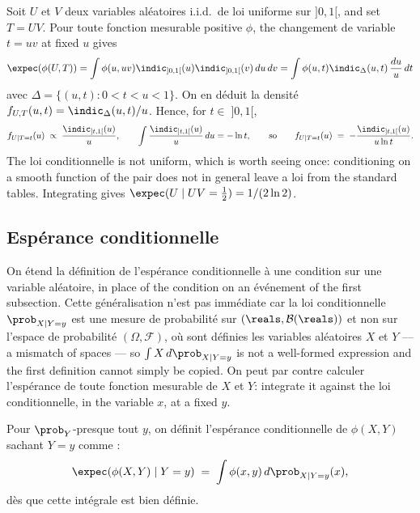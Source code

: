 \begin{example}
  Soit $U$ et $V$ deux variables aléatoires i.i.d.\ de loi uniforme sur $]0,1[$, and
  set $T = UV$. Pour toute fonction mesurable positive $\phi$, the changement de
  variable $t = uv$ at fixed $u$ gives
  \[
    \expec(\phi(U,T)) = \int \phi(u,uv) \indic_{]0,1[}(u) \indic_{]0,1[}(v) \, du \, dv
    = \int \phi(u,t) \indic_{\Delta}(u,t) \, \frac{du}{u} \, dt
  \]
  avec $\Delta = \{(u,t) : 0 < t < u < 1\}$. On en déduit la densité
  $f_{U,T}(u,t) = \indic_{\Delta}(u,t)/u$.
  Hence, for $t \in \;]0,1[$,
  \[
    f_{U \mid T = t}(u) \;\propto\; \frac{\indic_{]t,1[}(u)}{u} ,
    \qquad \int \frac{\indic_{]t,1[}(u)}{u} \, du = -\ln t ,
    \qquad\text{so}\qquad
    f_{U \mid T = t}(u) \;=\; -\frac{\indic_{]t,1[}(u)}{u \ln t} .
  \]
  The loi conditionnelle is not uniform, which is worth seeing once: conditioning on
  a smooth function of the pair does not in general leave a loi from the
  standard tables. Integrating gives
  $\expec(U \mid UV = \tfrac{1}{2}) = 1/(2\ln 2)$.
\end{example}

\subsection{Espérance conditionnelle}

On étend la définition de l'espérance conditionnelle à une condition sur une
variable aléatoire, in place of the condition on an événement of the first
subsection. Cette généralisation n'est pas immédiate car la loi conditionnelle
$\prob_{X \mid Y = y}$ est une mesure de probabilité sur $(\reals,\mathcal{B}(\reals))$
et non sur l'espace de probabilité $(\Omega,\mathcal{F})$, où sont définies les
variables aléatoires $X$ et $Y$ --- a mismatch of spaces --- so
$\int X \, d\prob_{X \mid Y = y}$ is not a well-formed expression and the first
definition cannot simply be copied. On peut par contre calculer l'espérance de toute
fonction mesurable de $X$ et $Y$: integrate it against the loi conditionnelle, in
the variable $x$, at a fixed $y$.

\begin{definition}[Espérance conditionnelle sachant $Y = y$]
  Pour $\prob_{Y}$-presque tout $y$, on définit l'espérance conditionnelle de
  $\phi(X,Y)$ sachant $Y = y$ comme :
  \[
    \expec(\phi(X,Y) \mid Y = y) \;=\; \int \phi(x,y) \, d\prob_{X \mid Y = y}(x) ,
  \]
  dès que cette intégrale est bien définie.
\end{definition}

